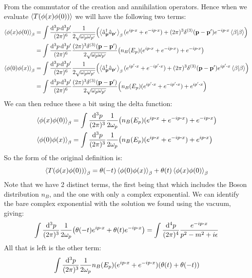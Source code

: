 \documentclass[12pt]{article}
\begin{document}
From the commutator of the creation and annihilation operators. Hence when we evaluate $\ev{T(\phi(x)\phi(0))}$ we will have the following two terms:
\begin{align*}
    \ev{\phi(x)\phi(0)}_\beta &= \int\frac{\dd[3]{p}\dd[3]{p'}}{(2\pi)^6}\frac{1}{2\sqrt{\omega_p\omega_{p'}}}
    \qty(\ev{\hat{a}^\dag_{\vb{p}}\hat{a}_{\vb{p}'}}_\beta(e^{ip\vdot x}+e^{-ip\vdot x})+
    (2\pi)^3\delta^{(3)}(\vb{p-p}')e^{-ip\vdot x}\ip{\beta})\\
    &= \int\frac{\dd[3]{p}\dd[3]{p'}}{(2\pi)^6}\frac{(2\pi)^3\delta^{(3)}(\vb{p-p}')}{2\sqrt{\omega_p\omega_{p'}}}
    \qty(n_B(E_p)(e^{ip\vdot x}+e^{-ip\vdot x})+e^{-ip\vdot x})\\
    \ev{\phi(0)\phi(x)}_\beta &= \int\frac{\dd[3]{p}\dd[3]{p'}}{(2\pi)^6}\frac{1}{2\sqrt{\omega_p\omega_{p'}}}
    \qty(\ev{\hat{a}^\dag_{\vb{p}}\hat{a}_{\vb{p}'}}_\beta(e^{ip'\vdot x}+e^{-ip'\vdot x})+
    (2\pi)^3\delta^{(3)}(\vb{p-p}')e^{ip'\vdot x}\ip{\beta})\\
    &= \int\frac{\dd[3]{p}\dd[3]{p'}}{(2\pi)^6}\frac{(2\pi)^3\delta^{(3)}(\vb{p-p}')}{2\sqrt{\omega_p\omega_{p'}}}
    \qty(n_B(E_p)(e^{ip'\vdot x}+e^{-ip'\vdot x})+e^{ip'\vdot x})
\end{align*}
We can then reduce these a bit using the delta function:
\begin{align*}
    \ev{\phi(x)\phi(0)}_\beta &= \int\frac{\dd[3]{p}}{(2\pi)^3}\frac{1}{2\omega_p}
    \qty(n_B(E_p)(e^{ip\vdot x}+e^{-ip\vdot x})+e^{-ip\vdot x})\\
    \ev{\phi(0)\phi(x)}_\beta &= \int\frac{\dd[3]{p}}{(2\pi)^3}\frac{1}{2\omega_p}
    \qty(n_B(E_p)(e^{ip\vdot x}+e^{-ip\vdot x})+e^{ip\vdot x})
\end{align*}
So the form of the original definition is:
\begin{align*}
    \ev{T(\phi(x)\phi(0))}_\beta=\theta(-t)\ev{\phi(0)\phi(x)}_\beta+\theta(t)\ev{\phi(x)\phi(0)}_\beta
\end{align*}
Note that we have 2 distinct terms, the first being that which includes the Boson distribution $n_B$, and the one with only a complex exponential. We can identify the bare complex exponential with the solution we found using the vacuum, giving:
\begin{align*}
    \int\frac{\dd[3]{p}}{(2\pi)^3}\frac1{2\omega_p}\qty(\theta(-t)e^{ip\vdot x}+\theta(t)e^{-ip\vdot x})=
    \int\frac{\dd[4]{p}}{(2\pi)^4}\frac{e^{-ip\vdot x}}{p^2-m^2+i\epsilon}
\end{align*}
All that is left is the other term:
\begin{align*}
    \int\frac{\dd[3]{p}}{(2\pi)^3}\frac1{2\omega_p}n_B(E_p)(e^{ip\vdot x}+e^{-ip\vdot x})(\theta(t)+\theta(-t))
\end{align*}
\end{document}

